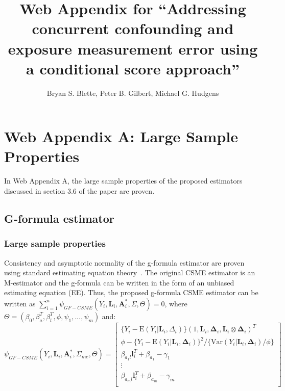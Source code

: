 \documentclass[12pt]{article}
\title{Web Appendix for ``Addressing concurrent confounding and exposure measurement error using a conditional score approach''}
\author{Bryan S. Blette, Peter B. Gilbert, Michael G. Hudgens}
\date{}
\begin{document}


\maketitle

\section{Web Appendix A: Large Sample Properties}

In Web Appendix A, the large sample properties of the proposed estimators discussed in section 3.6 of the paper are proven.

\subsection{G-formula estimator}

\subsubsection{Large sample properties}

Consistency and asymptotic normality of the g-formula estimator are proven using standard estimating equation theory~\citep{stefanski2002}. The original CSME estimator is an M-estimator and the g-formula can be written in the form of an unbiased estimating equation (EE). Thus, the proposed g-formula CSME estimator can be written as $\sum_{i=1}^{n} \psi_{GF-CSME}(Y_{i}, \bm{L}_{i}, \bm{A}^{*}_{i}, \Sigma, \Theta) = 0$, where $\Theta = (\beta_{0}, \beta^{T}_{a}, \beta^{T}_{l}, \phi, \psi_{1}, ..., \psi_{m})$ and:
\begin{equation*}
    \psi_{GF-CSME}(Y_{i}, \bm{L}_{i}, \bm{A}^{*}_{i}, \Sigma_{me}, \Theta) =
    \begin{bmatrix}
       \{ Y_{i} - \text{E}(Y_{i} | \bm{L}_{i}, \Delta_{i}) \} (1, \bm{L}_{i}, \bm{\Delta}_{i}, \bm{L}_{i} \otimes \bm{\Delta}_{i})^{T} \\
        \phi - \{ Y_{i} - \text{E}(Y_{i} | \bm{L}_{i}, \bm{\Delta}_{i}) \}^{2} / \{ \text{Var}(Y_{i} | \bm{L}_{i}, \bm{\Delta}_{i}) / \phi \} \\
        \beta_{a_{1}l}\bm{l}_{i}^{T} + \beta_{a_{1}} - \gamma_{1} \\
        \vdots \\
        \beta_{a_{m}l}\bm{l}_{i}^{T} + \beta_{a_{m}} - \gamma_{m} \\
    \end{bmatrix}
\end{equation*}
\end{document}
